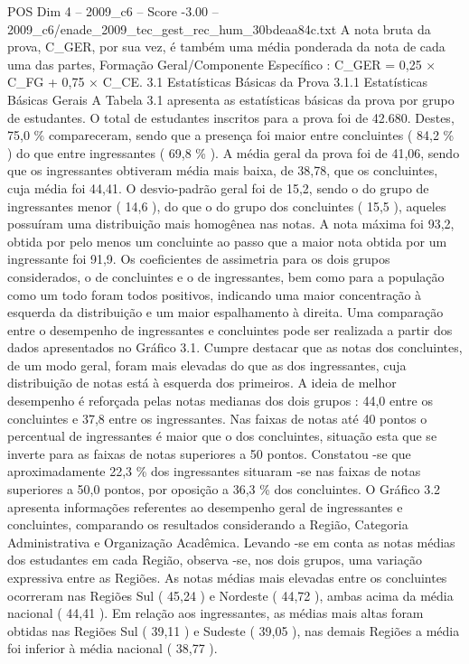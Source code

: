 \begin{textsample}{POS Dim 4 – 2009\_c6 – Score -3.00 – 2009\_c6/enade\_2009\_tec\_gest\_rec\_hum\_30bdeaa84c.txt}
A nota bruta da prova, C\_GER, por sua vez, é também uma média ponderada da nota de cada uma das partes, Formação Geral/Componente Específico : C\_GER = 0,25 × C\_FG + 0,75 × C\_CE. 3.1 Estatísticas Básicas da Prova 3.1.1 Estatísticas Básicas Gerais A Tabela 3.1 apresenta as estatísticas básicas da prova por grupo de estudantes.
O total de estudantes inscritos para a prova foi de 42.680.
Destes, 75,0 \% compareceram, sendo que a presença foi maior entre concluintes ( 84,2 \% ) do que entre ingressantes ( 69,8 \% ).
A média geral da prova foi de 41,06, sendo que os ingressantes obtiveram média mais baixa, de 38,78, que os concluintes, cuja média foi 44,41.
O desvio-padrão geral foi de 15,2, sendo o do grupo de ingressantes menor ( 14,6 ), do que o do grupo dos concluintes ( 15,5 ), aqueles possuíram uma distribuição mais homogênea nas notas.
A nota máxima foi 93,2, obtida por pelo menos um concluinte ao passo que a maior nota obtida por um ingressante foi 91,9.
Os coeficientes de assimetria para os dois grupos considerados, o de concluintes e o de ingressantes, bem como para a população como um todo foram todos positivos, indicando uma maior concentração à esquerda da distribuição e um maior espalhamento à direita.
Uma comparação entre o desempenho de ingressantes e concluintes pode ser realizada a partir dos dados apresentados no Gráfico 3.1.
Cumpre destacar que as notas dos concluintes, de um modo geral, foram mais elevadas do que as dos ingressantes, cuja distribuição de notas está à esquerda dos primeiros.
A ideia de melhor desempenho é reforçada pelas notas medianas dos dois grupos : 44,0 entre os concluintes e 37,8 entre os ingressantes.
Nas faixas de notas até 40 pontos o percentual de ingressantes é maior que o dos concluintes, situação esta que se inverte para as faixas de notas superiores a 50 pontos.
Constatou -se que aproximadamente 22,3 \% dos ingressantes situaram -se nas faixas de notas superiores a 50,0 pontos, por oposição a 36,3 \% dos concluintes.
O Gráfico 3.2 apresenta informações referentes ao desempenho geral de ingressantes e concluintes, comparando os resultados considerando a Região, Categoria Administrativa e Organização Acadêmica.
Levando -se em conta as notas médias dos estudantes em cada Região, observa -se, nos dois grupos, uma variação expressiva entre as Regiões.
As notas médias mais elevadas entre os concluintes ocorreram nas Regiões Sul ( 45,24 ) e Nordeste ( 44,72 ), ambas acima da média nacional ( 44,41 ).
Em relação aos ingressantes, as médias mais altas foram obtidas nas Regiões Sul ( 39,11 ) e Sudeste ( 39,05 ), nas demais Regiões a média foi inferior à média nacional ( 38,77 ).

\end{textsample}
